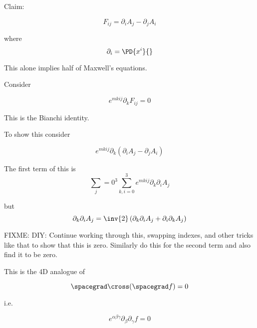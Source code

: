 Claim: 

\begin{equation}\label{eqn:relativisticElectrodynamicsL11:670}
F_{ij} = \partial_i A_j - \partial_j A_i
\end{equation}

where
\begin{equation}\label{eqn:relativisticElectrodynamicsL11:690}
\partial_i = \PD{x^i}{}
\end{equation}

This alone implies half of Maxwell's equations.

Consider

\begin{equation}\label{eqn:relativisticElectrodynamicsL11:710}
e^{m k i j} \partial_k F_{ij} = 0
\end{equation}

This is the Bianchi identity.

To show this consider

\begin{equation}\label{eqn:relativisticElectrodynamicsL11:730}
e^{m k i j} \partial_k (\partial_i A_j - \partial_j A_i)
\end{equation}

The first term of this is
\begin{equation}\label{eqn:relativisticElectrodynamicsL11:750}
\sum_j=0^3
\sum_{k,i=0}^3
e^{m k i j} \partial_k \partial_i A_j 
\end{equation}

but 
\begin{equation}\label{eqn:relativisticElectrodynamicsL11:770}
\partial_k \partial_i A_j 
= \inv{2} \left( \partial_k \partial_i A_j + \partial_i \partial_k A_j \right)
\end{equation}

FIXME: DIY: Continue working through this, swapping indexes, and other tricks like that to show that this is zero.  Similarly do this for the second term and also find it to be zero.

This is the 4D analogue of 

\begin{equation}\label{eqn:relativisticElectrodynamicsL11:790}
\spacegrad \cross (\spacegrad f) = 0
\end{equation}

i.e.

\begin{equation}\label{eqn:relativisticElectrodynamicsL11:810}
e^{\alpha\beta\gamma} \partial_\beta \partial_\gamma f = 0
\end{equation}

